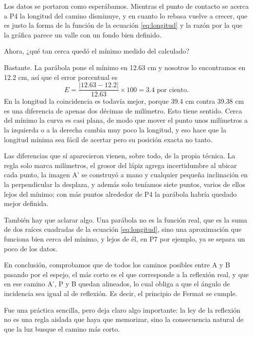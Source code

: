 Los datos se portaron como esperábamos. Mientras el punto de contacto se acerca a P4 la longitud del camino disminuye, y en cuanto lo rebasa vuelve a crecer, que es justo la forma de la función de la ecuación \eqref{eq:longitud} y la razón por la que la gráfica parece un valle con un fondo bien definido.

Ahora, ¿qué tan cerca quedó el mínimo medido del calculado?

Bastante. La parábola pone el mínimo en 12.63 cm y nosotros lo encontramos en 12.2 cm, así que el error porcentual es
\begin{equation}
E = \frac{\left| 12.63 - 12.2 \right|}{12.63} \times 100 = 3.4 \text{ por ciento}.
\label{eq:error}
\end{equation}
En la longitud la coincidencia es todavía mejor, porque 39.4 cm contra 39.38 cm es una diferencia de apenas dos décimas de milímetro. Esto tiene sentido. Cerca del mínimo la curva es casi plana, de modo que mover el punto unos milímetros a la izquierda o a la derecha cambia muy poco la longitud, y eso hace que la longitud mínima sea fácil de acertar pero su posición exacta no tanto.

Las diferencias que sí aparecieron vienen, sobre todo, de la propia técnica. La regla solo marca milímetros, el grosor del lápiz agrega incertidumbre al ubicar cada punto, la imagen A' se construyó a mano y cualquier pequeña inclinación en la perpendicular la desplaza, y además solo teníamos siete puntos, varios de ellos lejos del mínimo; con más puntos alrededor de P4 la parábola habría quedado mejor definida.

También hay que aclarar algo. Una parábola no es la función real, que es la suma de dos raíces cuadradas de la ecuación \eqref{eq:longitud}, sino una aproximación que funciona bien cerca del mínimo, y lejos de él, en P7 por ejemplo, ya se separa un poco de los datos.

En conclusión, comprobamos que de todos los caminos posibles entre A y B pasando por el espejo, el más corto es el que corresponde a la reflexión real, y que en ese camino A', P y B quedan alineados, lo cual obliga a que el ángulo de incidencia sea igual al de reflexión. Es decir, el principio de Fermat se cumple.

Fue una práctica sencilla, pero deja claro algo importante: la ley de la reflexión no es una regla aislada que haya que memorizar, sino la consecuencia natural de que la luz busque el camino más corto.
